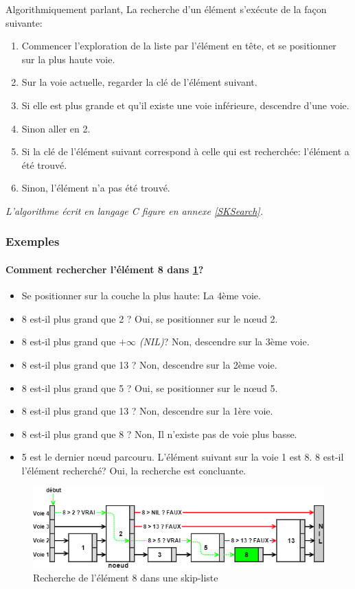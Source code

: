 \documentclass[hidelinks,a4paper, 12pt]{article}
\begin{document}
	Algorithmiquement parlant, La recherche d'un élément s'exécute de la façon suivante:
	\begin{enumerate}
		\item Commencer l'exploration de la liste par l'élément en tête, et se positionner sur la plus haute voie.
		\item Sur la voie actuelle, regarder la clé de l'élément suivant.
		\item Si elle est plus grande et qu'il existe une voie inférieure, descendre d'une voie.
		\item Sinon aller en 2.
		\item Si la clé de l'élément suivant correspond à celle qui est recherchée: l'élément a été trouvé.
		\item Sinon, l'élément n'a pas été trouvé.
	\end{enumerate}
	
	\emph{L'algorithme écrit en langage C figure en annexe \ref{SKSearch}.}
	
	\subsubsection*{Exemples}	
	\paragraph*{Comment rechercher l'élément 8 dans \cref{SkipSearch1}?}
	\begin{itemize}
		\item Se positionner sur la couche la plus haute: La 4ème voie.
		\item 8 est-il plus grand que 2 ? Oui, se positionner sur le nœud 2.
		\item 8 est-il plus grand que $+\infty$ \textit{(NIL)}? Non, descendre sur la 3ème voie.
		\item 8 est-il plus grand que 13  ? Non, descendre sur la 2ème voie.
		\item 8 est-il plus grand que 5 ? Oui, se positionner sur le nœud 5.
		\item 8 est-il plus grand que 13 ? Non, descendre sur la 1ère voie.
		\item 8 est-il plus grand que 8 ? Non, Il n'existe pas de voie plus basse.
		\item 5 est le dernier nœud parcouru. L'élément suivant sur la voie 1 est 8. 8 est-il l'élément recherché? Oui, la recherche est concluante.
	\end{itemize}
	\begin{figure}[h]
		\includegraphics[width=\textwidth]{img/search}
		\caption{Recherche de l'élément 8 dans une skip-liste}
		\label{SkipSearch1}
	\end{figure}
	
\end{document}
